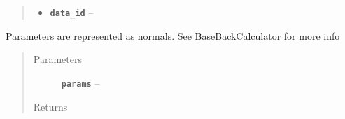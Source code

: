 \documentclass[letterpaper,10pt,english]{sphinxmanual}
\begin{document}
\begin{fulllineitems}
\begin{fulllineitems}
\begin{quote}
\begin{description}
\begin{itemize}
\item {} 
\textbf{\texttt{data\_id}} -- 

\end{itemize}

\end{description}\end{quote}

\end{fulllineitems}


\begin{fulllineitems}
\label{modules:backcalc.JCoupBackCalc.logp_params}
Parameters are represented as normals. See BaseBackCalculator for more
info
\begin{quote}\begin{description}
\item[{Parameters}] \leavevmode
\textbf{\texttt{params}} -- 

\item[{Returns}] \leavevmode


\end{description}\end{quote}

\end{fulllineitems}


\end{fulllineitems}

\end{document}
